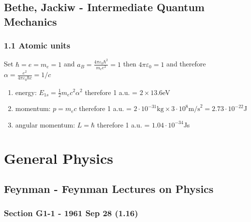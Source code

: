 \documentclass[10pt,a4paper]{article}
\theoremstyle{definition}
\begin{document}
\subsection{{\sc Bethe, Jackiw} - Intermediate Quantum Mechanics}
\subsubsection{1.1 Atomic units}
Set $\hbar=e=m_e=1$ and $a_B=\frac{4\pi\varepsilon_0\hbar^2}{m_ee^2}=1$ then $4\pi\varepsilon_0=1$ and therefore $\alpha=\frac{e^2}{4\pi\varepsilon_0\hbar c}=1/c$
\begin{enumerate}
\item energy: $E_{1s}=\frac{1}{2}m_ec^2\alpha^2$ therefore 1 a.u. = $2\times13.6$eV
\item momentum: $p=m_e c$ therefore 1 a.u. = $2\cdot 10^{-31}\text{kg}\times 3\cdot 10^8\text{m/s}^2=2.73\cdot10^{-22}$J
\item angular momentum: $L=\hbar$ therefore 1 a.u. = $1.04\cdot10^{-34}$Js 
\end{enumerate}



\section{General Physics}

\subsection{{\sc Feynman} - Feynman Lectures on Physics}
\subsubsection{Section G1-1 - 1961 Sep 28 (1.16)}
\end{document}
